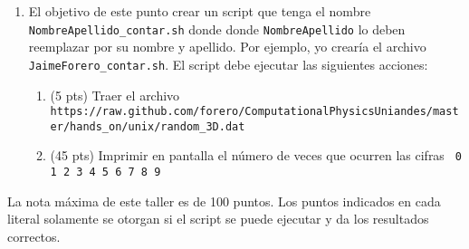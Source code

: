 \documentclass{article}
\begin{document}
\begin{enumerate}
\begin{enumerate}
\end{enumerate}
\item
El objetivo de este punto crear un script que tenga el nombre \verb"NombreApellido_contar.sh" donde donde \verb"NombreApellido" lo deben reemplazar por su nombre y apellido. Por ejemplo, yo crear\'ia el archivo \verb"JaimeForero_contar.sh". El script debe ejecutar las siguientes acciones:
\begin{enumerate}
\item (5 pts) Traer el archivo \verb"https://raw.github.com/forero/"\newline \verb"ComputationalPhysicsUniandes/master/hands_on/unix/random_3D.dat"
\item (45 pts) Imprimir en pantalla el n\'umero de veces que ocurren las cifras {\texttt{ 0 1 2 3 4 5 6 7 8 9}}
\end{enumerate}
\end{enumerate}

La nota m\'axima de este taller es de 100 puntos. Los puntos indicados en cada literal solamente se otorgan si el script se puede ejecutar y da los resultados correctos.
\end{document}
